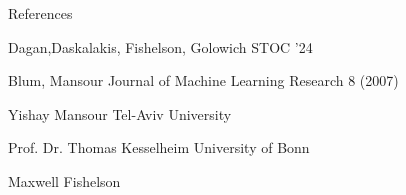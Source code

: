 \documentclass[aspectratio=169,xcolor=dvipsnames,t]{beamer}
\begin{document}
\begin{frame}{References}
    \footnotesize{
        \begin{thebibliography}{99}
             Dagan,Daskalakis, Fishelson, Golowich
            \newblock STOC ’24
            \newblock \emph{\href{https://arxiv.org/pdf/2310.19786}{}}
        \end{thebibliography}
        \begin{thebibliography}{99}
             Blum, Mansour
            \newblock Journal of Machine Learning Research 8 (2007)
            \newblock \emph{\href{https://www.jmlr.org/papers/volume8/blum07a/blum07a.pdf}{}}
        \end{thebibliography}
        \begin{thebibliography}{99}
             Yishay Mansour
            \newblock Tel-Aviv University
            \newblock \emph{\href{http://www.math.tau.ac.il/~mansour/course_games/2006}{}}
        \end{thebibliography}
        \begin{thebibliography}{99}
             Prof. Dr. Thomas Kesselheim
            \newblock University of Bonn 
            \newblock \emph{\href{https://tcs.cs.uni-bonn.de/doku.php?id=teaching:ws2021:vl-agt}{}}
        \end{thebibliography}
        \begin{thebibliography}{99}
             Maxwell Fishelson
            \newblock \emph{\href{http://maxkfish.com/wp-content/uploads/2024/03/treeswap.pdf}{}}
        \end{thebibliography}
    }
\end{frame}


\begin{frame}[plain]
\end{frame}

\end{document}
